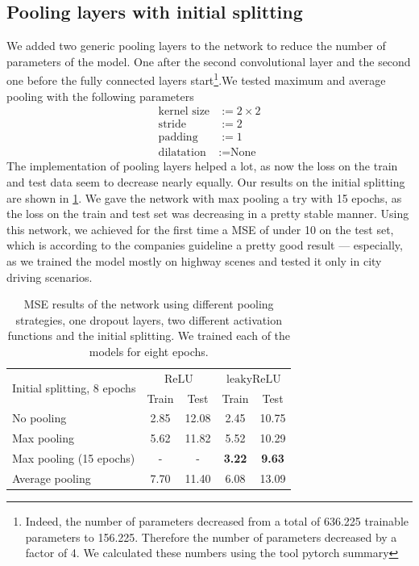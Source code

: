 \documentclass[conference]{IEEEtran}
\begin{document}
\subsection{Pooling layers with initial splitting}
We added two generic pooling layers to the network to reduce the number of parameters of the model. One after the second 
convolutional layer and the second one before the fully connected layers start\footnote{Indeed, the number of 
parameters decreased from a total of 636.225 trainable parameters to 156.225. Therefore the number of parameters decreased by a 
factor of 4. We calculated these numbers using the tool pytorch summary}.We tested maximum and average pooling with the following 
parameters
\begin{align*}
\text{kernel size} &:= 2\times 2\\
\text{stride} &:= 2\\
\text{padding} &:= 1\\
\text{dilatation} &:= \text{None}
\end{align*}
The implementation of pooling layers helped a lot, as now the loss on the train and test data seem to decrease 
nearly equally. Our results on the initial splitting are shown in \cref{tab:ResultsInitialSplitting}. We gave the network
with max pooling a try with 15 epochs, as the loss on the train and test set was decreasing in a pretty stable manner. Using this
network, we achieved for the first time a MSE of under 10 on the test set, which is according to the companies guideline a pretty 
good result --- especially, as we trained the model mostly on highway scenes and tested it only in city driving scenarios.
\begin{table}[!t]
\normalsize
\centering
\begin{tabular}{lcccc}
\toprule
\multirow{2}{*}{Initial splitting, 8 epochs}  & \multicolumn{2}{c}{$\mathrm{ReLU}$} & \multicolumn{2}{c}{$\mathrm{leakyReLU}$} \\
 & Train & Test & Train & Test\\
\midrule
No pooling & 2.85 & 12.08 & 2.45 & 10.75 \\
Max pooling & 5.62 & 11.82 & 5.52 & 10.29 \\
Max pooling (15 epochs) & - & - & \textbf{3.22} & \textbf{9.63} \\
Average pooling & 7.70 & 11.40 & 6.08 & 13.09\\
\bottomrule
\end{tabular}
\caption{MSE results of the network using different pooling strategies, one dropout layers, two different activation functions and 
the initial splitting. We trained each of the models for eight epochs.}
\label{tab:ResultsInitialSplitting}
\end{table}
\end{document}
